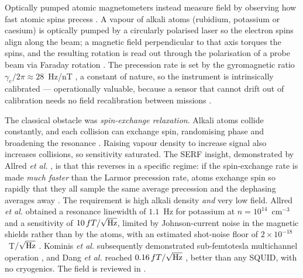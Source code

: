 \documentclass[11pt]{article}
\begin{document}
Optically pumped atomic magnetometers instead measure field by observing how fast
atomic spins precess \cite{budker2007}. A vapour of alkali atoms (rubidium,
potassium or caesium) is optically pumped by a circularly polarised laser so the
electron spins align along the beam; a magnetic field perpendicular to that axis
torques the spins, and the resulting rotation is read out through the
polarisation of a probe beam via Faraday rotation
\cite{griffith2010,seltzer2008}. The precession rate is set by the gyromagnetic
ratio $\gamma_e/2\pi\approx28$~Hz/nT \cite{wei2023,savukov2005}, a constant of
nature, so the instrument is intrinsically calibrated --- operationally valuable,
because a sensor that cannot drift out of calibration needs no field
recalibration between missions \cite{nist_micro}.

The classical obstacle was \emph{spin-exchange relaxation}. Alkali atoms collide
constantly, and each collision can exchange spin, randomising phase and
broadening the resonance \cite{happer1977,savukov2005}. Raising vapour density to
increase signal also increases collisions, so sensitivity saturated. The SERF
insight, demonstrated by Allred \emph{et al.} \cite{allred2002}, is that this
reverses in a specific regime: if the spin-exchange rate is made \emph{much
faster} than the Larmor precession rate, atoms exchange spin so rapidly that they
all sample the same average precession and the dephasing averages away
\cite{happer1977,savukov2005}. The requirement is high alkali density
\emph{and} very low field. Allred \emph{et al.} obtained a resonance linewidth of
$1.1$~Hz for potassium at $n=10^{14}$~cm$^{-3}$ and a sensitivity of
$10\,fT/\sqrt{\rm Hz}$, limited by Johnson-current noise in the magnetic shields
rather than by the atoms, with an estimated shot-noise floor of
$2\times10^{-18}$~T$/\sqrt{\rm Hz}$ \cite{allred2002}. Kominis \emph{et al.}
subsequently demonstrated sub-femtotesla multichannel operation
\cite{kominis2003}, and Dang \emph{et al.} reached $0.16\,fT/\sqrt{\rm Hz}$
\cite{dang2010}, better than any SQUID, with no cryogenics. The field is reviewed
in \cite{budker2007,li2018}.
\end{document}
